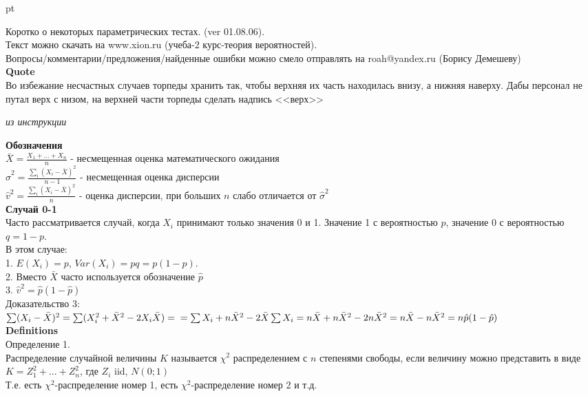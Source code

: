 \documentclass[pdftex,12pt,a4paper]{article}
\begin{document}
 pt %

Коротко о некоторых параметрических тестах. (ver 01.08.06). \\
Текст можно скачать на www.xion.ru (учеба-2 курс-теория
вероятностей). \\
Вопросы/комментарии/предложения/найденные ошибки можно смело
отправлять на
roah@yandex.ru (Борису Демешеву) \\


\textbf{Quote} \\
Во избежание несчастных случаев торпеды хранить так, чтобы верхняя
их часть находилась внизу, а нижняя наверху. Дабы персонал не
путал верх с низом, на верхней части торпеды сделать надпись
<<верх>>
\begin{flushright}
\emph{из инструкции} \\
\end{flushright}


\textbf{Обозначения} \\

$\bar{X}=\frac{X_{1}+...+X_{n}}{n}$ - несмещенная оценка математического ожидания \\
$\hat{\sigma}^{2}=\frac{\sum_{i}(X_{i}-\bar{X})^{2}}{n-1}$ - несмещенная оценка дисперсии \\
$\hat{v}^{2}=\frac{\sum_{i}(X_{i}-\bar{X})^{2}}{n}$ - оценка
дисперсии,
при больших $n$ слабо отличается от $\hat{\sigma}^{2}$ \\

\textbf{Случай 0-1}\\
Часто рассматривается случай, когда $X_{i}$ принимают только
значения 0 и 1. Значение 1 с вероятностью $p$, значение 0 с
вероятностью $q=1-p$. \\
В этом случае:\\
1. $E(X_{i})=p$, $Var(X_{i})=pq=p(1-p)$. \\
2. Вместо $\bar{X}$ часто используется обозначение $\hat{p}$ \\
3. $\hat{v}^{2}=\hat{p}(1-\hat{p})$ \\
Доказательство 3: \\
$\sum(X_{i}-\bar{X})^{2}=\sum(X_{i}^{2}+\bar{X}^{2}-2X_{i}\bar{X})= \\
= \sum X_{i}+n\bar{X}^{2}-2\bar{X}\sum
X_{i}=n\bar{X}+n\bar{X}^{2}-2n\bar{X}^{2}=n\bar{X}-n\bar{X}^{2}=n\hat{p}(1-\hat{p})$
\\

\textbf{Definitions} \\
Определение 1. \\
Распределение случайной величины $K$ называется $\chi^{2}$
распределением с $n$ степенями свободы, если величину можно
представить в виде $K=Z_{1}^{2}+...+Z_{n}^{2}$, где $Z_{i}$ iid,
$N(0;1)$ \\
Т.е. есть $\chi^{2}$-распределение номер 1, есть
$\chi^{2}$-распределение номер 2 и т.д.
\end{document}
